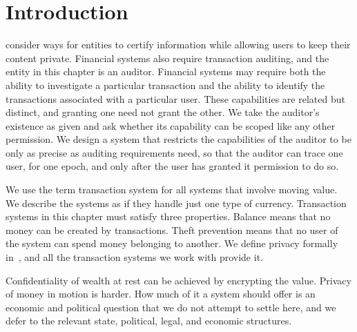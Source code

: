 \section{Introduction}

 consider ways for entities to certify
information while allowing users to keep their content private. Financial
systems also require transaction auditing, and the entity in this chapter is an
auditor. Financial systems may require both the ability to investigate a
particular transaction and the ability to identify the transactions associated
with a particular user. These capabilities are related but distinct, and
granting one need not grant the other. We take the auditor's existence as given
and ask whether its capability can be scoped like any other permission. We design a system that restricts the capabilities of the auditor to
be only as precise as auditing requirements need, so that the auditor can
trace one user, for one epoch, and only after the user has granted it
permission to do so.

We use the term transaction system for all systems that involve
moving value. We describe the systems as if they handle just one type of
currency. Transaction
systems in this chapter must satisfy three properties. Balance means that no
money can be created by transactions. Theft prevention means that no user of the
system can spend money belonging to another. We define privacy formally
in~, and all the transaction systems we work with
provide it.

Confidentiality of wealth at rest can be achieved by encrypting the value.
Privacy of money in motion is harder. How much of it a system should offer is an economic and political
question that we do not attempt to settle here, and we defer to the relevant
state, political, legal, and economic structures.

